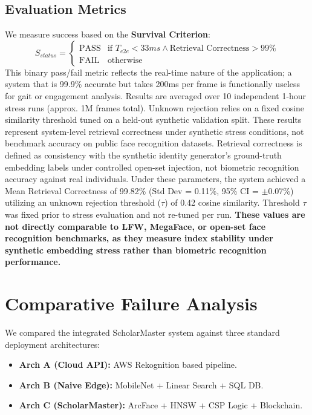 \documentclass[conference]{IEEEtran}
\begin{document}
\subsection{Evaluation Metrics}
We measure success based on the \textbf{Survival Criterion}:
\begin{equation}
S_{status} = 
\begin{cases} 
\text{PASS} & \text{if } T_{e2e} < 33ms \land \text{Retrieval Correctness} > 99\% \\
\text{FAIL} & \text{otherwise}
\end{cases}
\end{equation}
This binary pass/fail metric reflects the real-time nature of the application; a system that is 99.9\% accurate but takes 200ms per frame is functionally useless for gait or engagement analysis. Results are averaged over 10 independent 1-hour stress runs (approx. 1M frames total). Unknown rejection relies on a fixed cosine similarity threshold tuned on a held-out synthetic validation split. These results represent system-level retrieval correctness under synthetic stress conditions, not benchmark accuracy on public face recognition datasets. Retrieval correctness is defined as consistency with the synthetic identity generator's ground-truth embedding labels under controlled open-set injection, not biometric recognition accuracy against real individuals. Under these parameters, the system achieved a Mean Retrieval Correctness of 99.82\% (Std Dev = 0.11\%, 95\% CI = $\pm$0.07\%) utilizing an unknown rejection threshold ($\tau$) of 0.42 cosine similarity. Threshold $\tau$ was fixed prior to stress evaluation and not re-tuned per run. \textbf{These values are not directly comparable to LFW, MegaFace, or open-set face recognition benchmarks, as they measure index stability under synthetic embedding stress rather than biometric recognition performance.}

\section{Comparative Failure Analysis}

We compared the integrated ScholarMaster system against three standard deployment architectures:
\begin{itemize}
    \item \textbf{Arch A (Cloud API):} AWS Rekognition based pipeline.
    \item \textbf{Arch B (Naive Edge):} MobileNet + Linear Search + SQL DB.
    \item \textbf{Arch C (ScholarMaster):} ArcFace + HNSW + CSP Logic + Blockchain.
\end{itemize}
\end{document}
